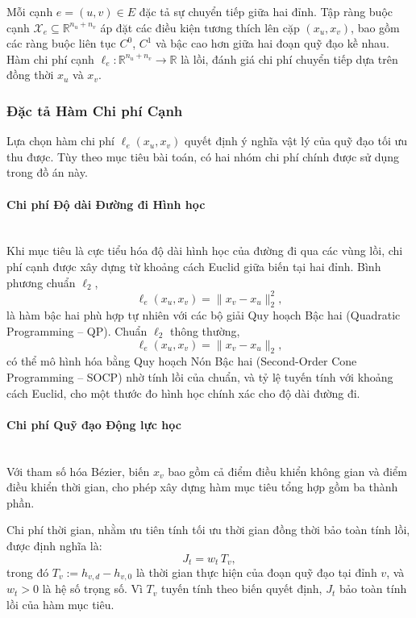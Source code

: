 Mỗi cạnh $e = (u, v) \in E$ đặc tả sự chuyển tiếp giữa hai đỉnh. Tập ràng buộc
cạnh $\mathcal{X}_e \subseteq \mathbb{R}^{n_u + n_v}$ áp đặt các điều kiện
tương thích lên cặp $(x_u, x_v)$, bao gồm các ràng buộc liên tục $C^0$, $C^1$
và bậc cao hơn giữa hai đoạn quỹ đạo kề nhau. Hàm chi phí cạnh $\ell_e \colon
  \mathbb{R}^{n_u + n_v} \to \mathbb{R}$ là lồi, đánh giá chi phí chuyển tiếp dựa
trên đồng thời $x_u$ và $x_v$.

\subsubsection{Đặc tả Hàm Chi phí Cạnh}
\label{subsubsec:gcs_cost}

Lựa chọn hàm chi phí $\ell_e(x_u, x_v)$ quyết định ý nghĩa vật lý của quỹ đạo
tối ưu thu được. Tùy theo mục tiêu bài toán, có hai nhóm chi phí chính được sử
dụng trong đồ án này.

\paragraph{Chi phí Độ dài Đường đi Hình học}\mbox{}\\

Khi mục tiêu là cực tiểu hóa độ dài hình học của đường đi qua các vùng lồi, chi
phí cạnh được xây dựng từ khoảng cách Euclid giữa biến tại hai đỉnh. Bình
phương chuẩn $\ell_2$,
\[
  \ell_e(x_u, x_v) = \|x_v - x_u\|_2^2,
\]
là hàm bậc hai phù hợp tự nhiên với các bộ giải Quy hoạch Bậc hai (Quadratic
Programming -- QP). Chuẩn $\ell_2$ thông thường,
\[
  \ell_e(x_u, x_v) = \|x_v - x_u\|_2,
\]
có thể mô hình hóa bằng Quy hoạch Nón Bậc hai (Second-Order Cone Programming --
SOCP) nhờ tính lồi của chuẩn, và tỷ lệ tuyến tính với khoảng cách Euclid, cho
một thước đo hình học chính xác cho độ dài đường đi.

\paragraph{Chi phí Quỹ đạo Động lực học}\mbox{}\\

Với tham số hóa Bézier, biến $x_v$ bao gồm cả điểm điều khiển không gian và
điểm điều khiển thời gian, cho phép xây dựng hàm mục tiêu tổng hợp gồm ba thành
phần.

Chi phí thời gian, nhằm ưu tiên tính tối ưu thời gian đồng thời bảo toàn tính
lồi, được định nghĩa là:
\begin{equation}
  J_t = w_t\, T_v,
  \label{eq:time_cost}
\end{equation}
trong đó $T_v := h_{v,d} - h_{v,0}$ là thời gian thực hiện của đoạn quỹ đạo tại
đỉnh $v$, và $w_t > 0$ là hệ số trọng số.
Vì $T_v$ tuyến tính theo biến quyết định, $J_t$ bảo toàn tính lồi của hàm mục tiêu.

